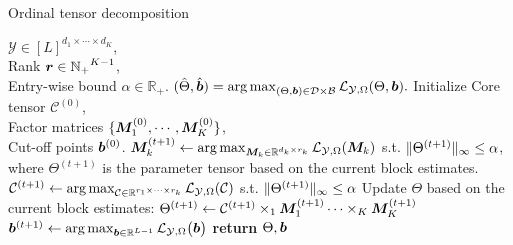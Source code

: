 \documentclass{article}
\theoremstyle{plain}
\theoremstyle{definition}
\begin{document}
\begin{algorithm}[]
        \caption{Ordinal tensor decomposition }\label{alg}
        \begin{algorithmic}[]
              
            $\mathcal{Y}\in [L]^{d_1\times\cdots\times d_K}
            $,\\ \hspace{.43in} Rank $\bm{r}\in \mathbb{N_+}^{K-1}$,\\
            \hspace{.43in} Entry-wise bound $\alpha\in \mathbb{R_+}$.
             $(\hat\Theta,\hat{\bm{b}}) =  \operatorname*{arg\,max}_{(\Theta,\bm{b})\in \mathcal{D}\times\mathcal{B}}  \mathcal{L}_{\mathcal{Y},\Omega}(\Theta,\bm{b}).$
            \STATE Initialize  Core tensor $\mathcal{C}^{(0)}$,\\
            \hspace{.5in} Factor matrices $ \{\bm M_1^{(0)},\cdots,\bm M_K^{(0)}\}$,\\
            \hspace{.5in} Cut-off points $\bm{b}^{(0)}$.
            \STATE $\bm M_k^{(t+1)}\gets\operatorname*{arg\,max}_{\bm M_k\in\mathbb{R}^{d_k\times r_k}}\mathcal{L}_{\mathcal{Y},\Omega}(\bm M_k)$
            \newline
             s.t. $\lVert\Theta^{(t+1)}\rVert_\infty\leq \alpha$, where $\Theta^{(t+1)}$ is the parameter tensor based on the current block estimates.
            \ENDFOR
            \STATE $\mathcal{C}^{(t+1)} \gets \operatorname*{arg\,max}_{\mathcal{C}\in \mathbb{R}^{r_1\times\cdots\times r_k}}\mathcal{L}_{\mathcal{Y},\Omega}(\mathcal{C})$
            s.t.  $\lVert\Theta^{(t+1)}\rVert_\infty\leq \alpha$
            \STATE Update $\Theta$ based on the current block estimates:
            \STATE $\Theta^{(t+1)} \gets \mathcal{C}^{(t+1)}\times_1\bm M_1^{(t+1)}\cdots\times_K\bm M_K^{(t+1)}$
            \STATE $\bm{b}^{(t+1)} \gets \operatorname*{arg\,max}_{\bm{b}\in \mathbb{R}^{L-1}}\mathcal{L}_{\mathcal{Y},\Omega}\big(\bm{b}\big)$
            \ENDFOR
            \STATE \textbf{return}
            $\Theta,\bm{b}$
        \end{algorithmic}
    \end{algorithm}
\end{document}
